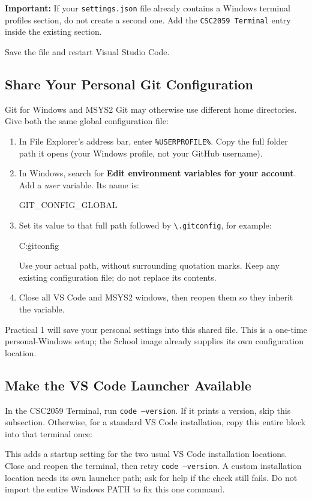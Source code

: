 \documentclass{csc2059practical}
\begin{document}
\textbf{Important:} If your \texttt{settings.json} file already contains a
Windows terminal profiles section, do not create a second one. Add the \texttt{CSC2059 Terminal} entry inside the existing section.

Save the file and restart Visual Studio Code.

\subsection{Share Your Personal Git Configuration}
Git for Windows and MSYS2 Git may otherwise use different home directories. Give both the same global configuration file:
\begin{enumerate}
\item In File Explorer's address bar, enter \texttt{\%USERPROFILE\%}. Copy the full folder path it opens (your Windows profile, not your GitHub username).
\item In Windows, search for \textbf{Edit environment variables for your account}. Add a \emph{user} variable. Its name is:
\begin{terminal}
GIT_CONFIG_GLOBAL
\end{terminal}
\item Set its value to that full path followed by \texttt{\textbackslash{}.gitconfig}, for example:
\begin{terminal}
C:\Users\Jane\.gitconfig
\end{terminal}
Use your actual path, without surrounding quotation marks. Keep any existing configuration file; do not replace its contents.
\item Close all VS Code and MSYS2 windows, then reopen them so they inherit the variable.
\end{enumerate}
Practical 1 will save your personal settings into this shared file. This is a one-time personal-Windows setup; the School image already supplies its own configuration location.

\subsection{Make the VS Code Launcher Available}
In the CSC2059 Terminal, run \texttt{code --version}. If it prints a version, skip this subsection. Otherwise, for a standard VS Code installation, copy this entire block into that terminal once:
This adds a startup setting for the two usual VS Code installation locations. Close and reopen the terminal, then retry \texttt{code --version}. A custom installation location needs its own launcher path; ask for help if the check still fails. Do not import the entire Windows PATH to fix this one command.
\end{document}

